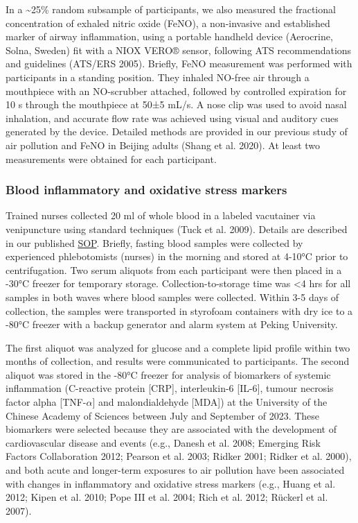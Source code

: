 \documentclass[
  letterpaper,
  DIV=11,
  numbers=noendperiod]{scrartcl}
\begin{document}
In a \textasciitilde25\% random subsample of participants, we also
measured the fractional concentration of exhaled nitric oxide (FeNO), a
non-invasive and established marker of airway inflammation, using a
portable handheld device (Aerocrine, Solna, Sweden) fit with a NIOX
VERO® sensor, following ATS recommendations and guidelines (ATS/ERS
2005). Briefly, FeNO measurement was performed with participants in a
standing position. They inhaled NO-free air through a mouthpiece with an
NO-scrubber attached, followed by controlled expiration for 10 s through
the mouthpiece at 50±5 mL/s. A nose clip was used to avoid nasal
inhalation, and accurate flow rate was achieved using visual and
auditory cues generated by the device. Detailed methods are provided in
our previous study of air pollution and FeNO in Beijing adults (Shang et
al. 2020). At least two measurements were obtained for each participant.

\subsubsection{Blood inflammatory and oxidative stress
markers}\label{blood-inflammatory-and-oxidative-stress-markers}

Trained nurses collected 20 ml of whole blood in a labeled vacutainer
via venipuncture using standard techniques (Tuck et al. 2009). Details
are described in our published \href{https://osf.io/zwpfg}{SOP}.
Briefly, fasting blood samples were collected by experienced
phlebotomists (nurses) in the morning and stored at 4-10°C prior to
centrifugation. Two serum aliquots from each participant were then
placed in a -30°C freezer for temporary storage. Collection-to-storage
time was \textless4 hrs for all samples in both waves where blood
samples were collected. Within 3-5 days of collection, the samples were
transported in styrofoam containers with dry ice to a -80°C freezer with
a backup generator and alarm system at Peking University.

The first aliquot was analyzed for glucose and a complete lipid profile
within two months of collection, and results were communicated to
participants. The second aliquot was stored in the -80°C freezer for
analysis of biomarkers of systemic inflammation (C-reactive protein
{[}CRP{]}, interleukin-6 {[}IL-6{]}, tumour necrosis factor alpha
{[}TNF-\(\alpha\){]} and malondialdehyde {[}MDA{]}) at the University of
the Chinese Academy of Sciences between July and September of 2023.
These biomarkers were selected because they are associated with the
development of cardiovascular disease and events (e.g., Danesh et al.
2008; Emerging Risk Factors Collaboration 2012; Pearson et al. 2003;
Ridker 2001; Ridker et al. 2000), and both acute and longer-term
exposures to air pollution have been associated with changes in
inflammatory and oxidative stress markers (e.g., Huang et al. 2012;
Kipen et al. 2010; Pope III et al. 2004; Rich et al. 2012; Rückerl et
al. 2007).
\end{document}

